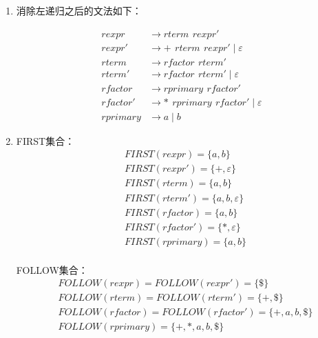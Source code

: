 \documentclass[UTF8]{report}
\begin{document}
\begin{enumerate}[label=(\arabic*)]
    \item 消除左递归之后的文法如下：
    
    \begin{align*}
        rexpr &\to rterm \,\ rexpr' \\
        rexpr' &\to + \,\ rterm \,\ rexpr' \mid \varepsilon \\
        rterm &\to rfactor \,\ rterm' \\
        rterm' &\to rfactor \,\ rterm' \mid \varepsilon \\
        rfactor &\to rprimary \,\ rfactor' \\
        rfactor' &\to * \,\ rprimary \,\ rfactor' \mid \varepsilon \\
        rprimary &\to a \mid b
    \end{align*}

    \item 
    FIRST集合：
    \begin{align*}
        &FIRST(rexpr) = \{a, b\} \\
        &FIRST(rexpr') = \{+, \varepsilon\} \\
        &FIRST(rterm) = \{a, b\} \\
        &FIRST(rterm') = \{a, b, \varepsilon\} \\
        &FIRST(rfactor) = \{a, b\} \\
        &FIRST(rfactor') = \{*, \varepsilon\} \\
        &FIRST(rprimary) = \{a, b\} \\ 
    \end{align*}

    FOLLOW集合：
    \begin{align*}
        &FOLLOW(rexpr) = FOLLOW(rexpr') = \{\$\} \\
        &FOLLOW(rterm) = FOLLOW(rterm') = \{+, \$\} \\
        &FOLLOW(rfactor) = FOLLOW(rfactor') = \{+, a, b, \$\} \\
        &FOLLOW(rprimary) = \{+, *, a, b, \$\}
    \end{align*}


\end{enumerate}
\end{document}
